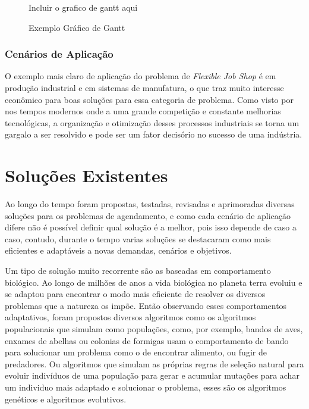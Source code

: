             \begin{figure}[ht]
                \centering
                \small{Incluir o grafico de gantt aqui}
                \caption{Exemplo Gráfico de Gantt}
                \label{fig:plot-gantt}
            \end{figure}
        


        \subsubsection{Cenários de Aplicação}
            O exemplo mais claro de aplicação do problema de \textit{Flexible Job Shop} é em produção industrial e em sistemas de manufatura, o que traz muito interesse econômico para boas soluções para essa categoria de problema.\newline
            Como visto por \cite{Wari2016} nos tempos modernos onde a uma grande competição e constante melhorias tecnológicas, a organização e otimização desses processos industriais se torna um gargalo a ser resolvido e pode ser um fator decisório no sucesso de uma indústria.
        
    


\section{Soluções Existentes}
        Ao longo do tempo foram propostas, testadas, revisadas e aprimoradas diversas soluções para os problemas de agendamento, e como cada cenário de aplicação difere não é possível definir qual solução é a melhor, pois isso depende de caso a caso, contudo, durante o tempo varias soluções se destacaram como mais eficientes e adaptáveis a novas demandas, cenários e objetivos.\newline
        
        Um tipo de solução muito recorrente são as baseadas em comportamento biológico. Ao longo de milhões de anos a vida biológica no planeta terra evoluiu e se adaptou para encontrar o modo mais eficiente de resolver os diversos problemas que a natureza os impõe. Então observando esses comportamentos adaptativos, foram propostos diversos algoritmos como os algoritmos populacionais que simulam como populações, como, por exemplo, bandos de aves, enxames de abelhas ou colonias de formigas usam o comportamento de bando para solucionar um problema como o de encontrar alimento, ou fugir de predadores. Ou algoritmos que simulam as próprias regras de seleção natural para evoluir indivíduos de uma população para gerar e acumular mutações para achar um individuo mais adaptado e solucionar o problema, esses são os algoritmos genéticos e algoritmos evolutivos.


